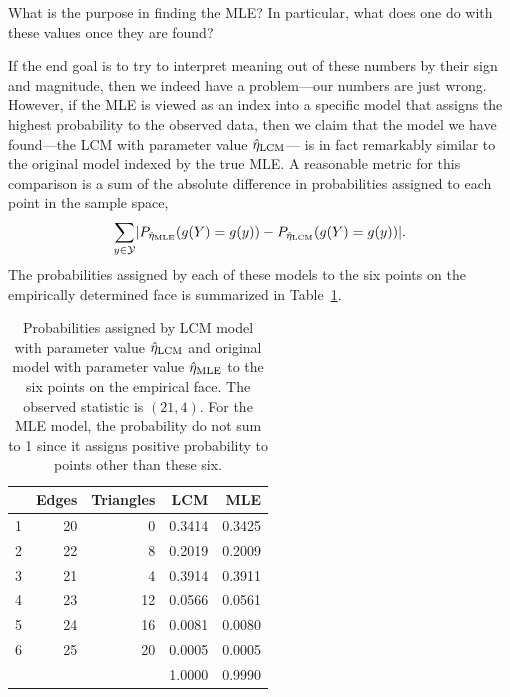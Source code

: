 What is the purpose in finding the MLE?  In particular, what does one do with these values once they are found?

If the end goal is to try to interpret meaning out of these numbers by their sign and  
magnitude, then we indeed have a problem---our numbers are just wrong.  
However, if the MLE is viewed as an 
index into a specific model that assigns the highest probability to the observed data,
then we claim that the model we have found---the LCM with parameter value $\hat{\eta}_{\textrm{LCM}}$---
is in fact remarkably similar to the original model indexed by the true MLE.  A 
reasonable metric for this comparison is a sum of the absolute difference in 
probabilities assigned to each point in the sample space,
\begin{align*}
	\sum_{y \in {\mathcal Y}} \lvert  P_{\hat{\eta}_{\textrm{MLE}}}(g(Y) =g(y) ) -  P_{\hat{\eta}_{\textrm{LCM}}}(g(Y) = g(y))   \rvert.
\end{align*}
The probabilities assigned by each of these models to the six points on the 
empirically determined face is summarized in Table~\ref{T:LCMvsMLE}.

\begin{table}[h!] \label{T:LCMvsMLE}
\begin{center}
\caption{Probabilities assigned by LCM model with parameter value $\hat{\eta}_{\textrm{LCM}}$ and 
original model with parameter value $\hat{\eta}_{\textrm{MLE}}$ to the six points on the empirical face.  The observed statistic is $(21,4)$.  For the MLE model, the probability do 
not sum to 1 since it assigns positive probability to points other than these six.}

\begin{tabular}{rrrrr}
\\  \hline
 & Edges & Triangles & LCM & MLE \\ 
  \hline
1 & 20 & 0 & 0.3414 & 0.3425 \\ 
  2 & 22 & 8 & 0.2019 & 0.2009 \\ 
  3 & 21 & 4 & 0.3914 & 0.3911 \\ 
  4 & 23 & 12 & 0.0566 & 0.0561 \\ 
  5 & 24 & 16 & 0.0081 & 0.0080 \\ 
  6 & 25 & 20 & 0.0005 & 0.0005 \\ 
   \hline
   &  &  & 1.0000 & 0.9990 \\ 
\end{tabular}
\end{center}
\end{table}

